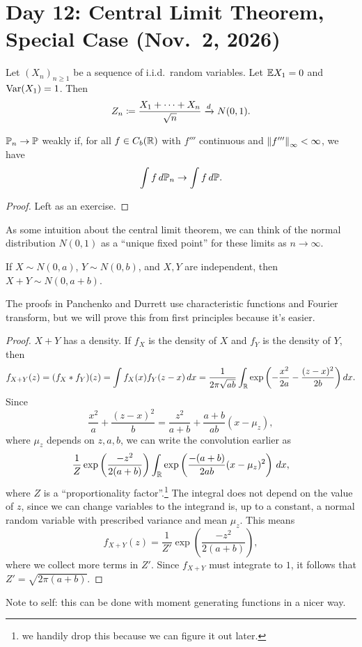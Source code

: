 \section{Day 12: Central Limit Theorem, Special Case (Nov.\ 2, 2026)}
Let $(X_n)_{n \geq 1}$ be a sequence of i.i.d.\ random variables. Let $\mathbb E X_1 = 0$ and $\operatorname{Var}(X_1) = 1$. Then
\[ Z_n \coloneq \frac{X_1 + \dots + X_n}{\sqrt{n}} \xrightarrow{d} N(0, 1). \] \vspace{-16pt}
\begin{lemma} \label{lem:weak_convergence_third_derivative}
    $\mathbb P_n \to \mathbb P$ weakly if, for all $f \in C_b(\mathbb R)$ with $f'''$ continuous and $\left\lVert f''' \right\rVert_\infty < \infty$, we have
    \[ \int f \, d\mathbb P_n \to \int f \, d\mathbb P. \]
\end{lemma} \vspace{-8pt}
\begin{proof}
    Left as an exercise. 
\end{proof}

As some intuition about the central limit theorem, we can think of the normal distribution $N(0, 1)$ as a ``unique fixed point'' for these limits as $n \to \infty$.
\begin{lemma} \label{lem:sum_of_normal_rv}
    If $X \sim N(0, a)$, $Y \sim N(0, b)$, and $X, Y$ are independent, then $X + Y \sim N(0, a + b)$.
\end{lemma}
The proofs in Panchenko and Durrett use characteristic functions and Fourier transform, but we will prove this from first principles because it's easier.
\begin{proof}
    $X + Y$ has a density. If $f_X$ is the density of $X$ and $f_Y$ is the density of $Y$, then
    \[ f_{X+Y}(z) = (f_X \ast f_Y)(z) = \int f_X(x) f_Y(z - x) \, dx = \frac{1}{2\pi \sqrt{ab}} \int_\mathbb R \exp\left(- \frac{x^2}{2a} - \frac{(z - x)^2}{2b}\right) dx. \]
    Since
    \[ \frac{x^2}{a} + \frac{(z - x)^2}{b} = \frac{z^2}{a + b} + \frac{a+b}{ab}\left(x - \mu_z\right), \]
    where $\mu_z$ depends on $z, a, b$, we can write the convolution earlier as
    \[ \frac{1}{Z} \exp \left(\frac{-z^2}{2(a + b)}\right) \int_\mathbb R \exp\left(\frac{-(a + b)}{2ab} (x - \mu_z)^2\right) \, dx, \]
    where $Z$ is a ``proportionality factor''.\footnote{we handily drop this because we can figure it out later.} The integral does not depend on the value of $z$, since we can change variables to the integrand is, up to a constant, a normal random variable with prescribed variance and mean $\mu_z$. This means
    \[ f_{X+Y}(z) = \frac{1}{Z'} \exp\left(\frac{-z^2}{2(a + b)}\right), \]
    where we collect more terms in $Z'$. Since $f_{X+Y}$ must integrate to $1$, it follows that $Z' = \sqrt{2\pi(a + b)}$.
\end{proof}
{\color{crimson} Note to self: this can be done with moment generating functions in a nicer way.}

